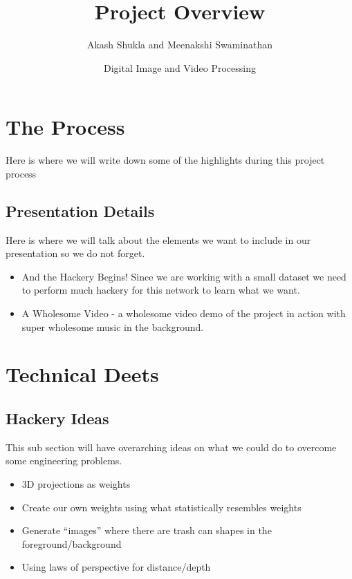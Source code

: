 \documentclass[12pt,letterpaper]{article}
\title{Project Overview}
\author{Akash Shukla and Meenakshi Swaminathan}
\date{Digital Image and Video Processing}
\begin{document}
\maketitle

\section*{The Process}
Here is where we will write down some of the highlights during this project process
\subsection*{Presentation Details}
Here is where we will talk about the elements we want to include in our presentation so we do not forget.
\begin{itemize}
    \item And the Hackery Begins! Since we are working with a small dataset we need to perform much hackery for this network to learn what we want. 
    \item A Wholesome Video - a wholesome video demo of the project in action with super wholesome music in the background.
\end{itemize}
\section*{Technical Deets}
\subsection*{Hackery Ideas}
This sub section will have overarching ideas on what we could do to overcome some engineering problems.
\begin{itemize}
    \item 3D projections as weights
    \item Create our own weights using what statistically resembles weights
    \item Generate “images” where there are trash can shapes in the foreground/background

    \item Using laws of perspective for distance/depth
\end{itemize}
\end{document}
